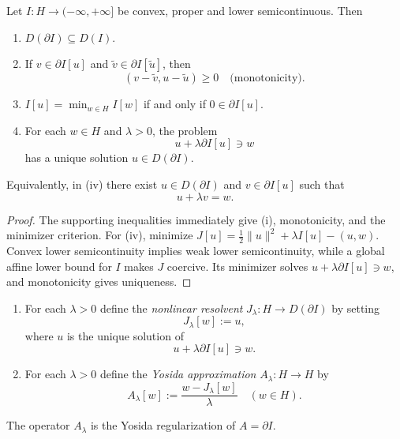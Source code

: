 \begin{theorem}
\label{thm:properties-of-subdifferentials}
Let $I : H \to (-\infty, +\infty]$ be convex, proper and lower semicontinuous. Then
\begin{enumerate}
\item[(i)] $D(\partial I) \subseteq D(I)$.
\item[(ii)] If $v \in \partial I[u]$ and $\tilde{v} \in \partial I[\tilde{u}]$, then
\[
(v - \tilde{v}, u - \tilde{u}) \geq 0 \quad \text{(monotonicity)}.
\]
\item[(iii)] $I[u] = \min_{w \in H} I[w]$ if and only if $0 \in \partial I[u]$.
\item[(iv)] For each $w \in H$ and $\lambda > 0$, the problem
\[
u + \lambda \partial I[u] \ni w
\]
has a unique solution $u \in D(\partial I)$.
\end{enumerate}
Equivalently, in (iv) there exist $u\in D(\partial I)$ and $v\in\partial I[u]$ such that
\[
u + \lambda v = w.
\]
\end{theorem}

\begin{proof}
\sketch The supporting inequalities immediately give (i), monotonicity, and the minimizer criterion. For (iv), minimize $J[u]=\frac12\|u\|^2+\lambda I[u]-(u,w)$. Convex lower semicontinuity implies weak lower semicontinuity, while a global affine lower bound for $I$ makes $J$ coercive. Its minimizer solves $u+\lambda\partial I[u]\ni w$, and monotonicity gives uniqueness.
\end{proof}

\begin{definition}
\label{def:nonlinear-resolvent-yosida}
\begin{enumerate}
\item[(1)] For each $\lambda > 0$ define the \textit{nonlinear resolvent} $J_\lambda : H \to D(\partial I)$ by setting
\[
J_\lambda[w] := u,
\]
where $u$ is the unique solution of
\[
u + \lambda \partial I[u] \ni w.
\]
\item[(2)] For each $\lambda > 0$ define the \textit{Yosida approximation} $A_\lambda : H \to H$ by
\[
A_\lambda[w] := \frac{w - J_\lambda[w]}{\lambda} \quad (w \in H).
\tag{7}
\]
\end{enumerate}
The operator $A_\lambda$ is the Yosida regularization of $A=\partial I$.
\end{definition}

